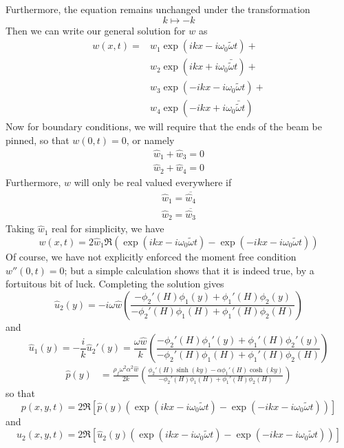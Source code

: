 \documentclass{article}
\begin{document}
Furthermore, the equation remains unchanged under the transformation
\[ k \mapsto -k \]
Then we can write our general solution for $w$ as 
\begin{align*}
w(x,t)=&\hat{w}_1 \exp(ikx-i\omega_0 \tilde{\omega} t) + \\
       & \hat{w}_2 \exp(ikx+i\omega_0 \bar{\tilde{\omega}} t) + \\
       & \hat{w}_3 \exp(-ikx-i\omega_0 \tilde{\omega} t) + \\
       & \hat{w}_4 \exp(-ikx+i\omega_0 \bar{\tilde{\omega}} t)
\end{align*}
Now for boundary conditions, we will require that the ends of the beam be pinned, so that
$w(0,t) = 0$, or namely
\begin{align*}
\hat{w}_1+\hat{w}_3=0 \\
\hat{w}_2+\hat{w}_4=0
\end{align*}
Furthermore, $w$ will only be real valued everywhere if
\begin{align*}
\hat{w}_1=\overline{\hat{w}_4} \\
\hat{w}_2=\overline{\hat{w}_3}
\end{align*}
Taking $\hat{w}_1$ real for simplicity,  we have
\begin{equation}   w(x,t) = 2\hat{w}_1\Re (\exp(ikx-i\omega_0 \tilde{\omega}t)-\exp(-ikx-i\omega_0 \tilde{\omega}t))  \label{eq:eq1900} \end{equation}
Of course, we have not explicitly enforced the moment free condition $w''(0,t) = 0$; but a simple calculation shows that it is indeed true, by a fortuitous bit of luck.
Completing the solution gives
\[\hat{u}_2(y) = -i \omega \hat{w} \left(\frac{-\phi_2'(H)\phi_1(y)+\phi_1'(H)\phi_2(y)}{-\phi_2'(H)\phi_1(H)+\phi_1'(H)\phi_2(H)}\right) \]
and
\[ \hat{u}_1(y) = -\frac{i}{k}\hat{u}_2'(y) =   \frac{\omega \hat{w}}{k} \left(\frac{-\phi_2'(H)\phi_1'(y)+\phi_1'(H)\phi_2'(y)}{-\phi_2'(H)\phi_1(H)+\phi_1'(H)\phi_2(H)}\right) \]
\begin{align*}
\hat{p}(y) &= \frac{\rho_f\omega^2\alpha^2\hat{w}}{2k}\left(\frac{\phi_2'(H)\sinh(ky)-\alpha \phi_1'(H)\cosh(ky)}{-\phi_2'(H)\phi_1(H)+\phi_1'(H)\phi_2(H)}\right)
\end{align*}
so that
\begin{equation}
p(x,y,t) = 2\Re\left[\hat{p}(y)\left(\exp(ikx-i\omega_0 \tilde{\omega}t)-\exp(-ikx-i\omega_0 \tilde{\omega}t)\right)\right]
\label{eq:eq2000} \end{equation}
and
\begin{equation}
u_2(x,y,t) = 2\Re\left[\hat{u}_2(y)\left(\exp(ikx-i\omega_0 \tilde{\omega}t)-\exp(-ikx-i\omega_0 \tilde{\omega}t)\right)\right]
\label{eq:eq2100} \end{equation}
\end{document}

